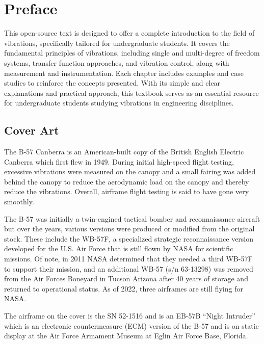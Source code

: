 \documentclass[12pt,letter]{article}
\begin{document}
\setcounter{secnumdepth}{0} %

\section{Preface}
This open-source text is designed to offer a complete introduction to the field of vibrations, specifically tailored for undergraduate students. It covers the fundamental principles of vibrations, including single and multi-degree of freedom systems, transfer function approaches, and vibration control, along with measurement and instrumentation. Each chapter includes examples and case studies to reinforce the concepts presented. With its simple and clear explanations and practical approach, this textbook serves as an essential resource for undergraduate students studying vibrations in engineering disciplines.









\subsection{Cover Art}
The B-57 Canberra is an American-built copy of the British English Electric Canberra which first flew in 1949. During initial high-speed flight testing, excessive vibrations were measured on the canopy and a small fairing was added behind the canopy to reduce the aerodynamic load on the canopy and thereby reduce the vibrations. Overall, airframe flight testing is said to have gone very smoothly. 

The B-57 was initially a twin-engined tactical bomber and reconnaissance aircraft but over the years, various versions were produced or modified from the original stock. These include the WB-57F, a specialized strategic reconnaissance version developed for the U.S. Air Force that is still flown by NASA for scientific missions. Of note, in 2011 NASA determined that they needed a third WB-57F to support their mission, and an additional WB-57 (s/n 63-13298) was removed from the Air Forces Boneyard in Tucson Arizona after 40 years of storage and returned to operational status. As of 2022, three airframes are still flying for NASA.

The airframe on the cover is the SN 52-1516 and is an EB-57B ``Night Intruder'' which is an electronic countermeasure (ECM) version of the B-57 and is on static display at the Air Force Armament Museum at Eglin Air Force Base, Florida. 
\end{document}
